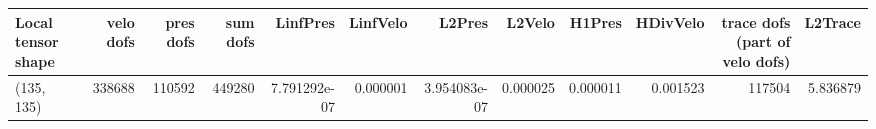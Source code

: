 \begin{tabular}{lrrrrrrrrrrr}
\toprule
Local tensor shape &  velo dofs &  pres dofs &  sum dofs &     LinfPres &  LinfVelo &       L2Pres &   L2Velo &   H1Pres &  HDivVelo &  trace dofs (part of velo dofs) &  L2Trace \\
\midrule
        (135, 135) &     338688 &     110592 &    449280 & 7.791292e-07 &  0.000001 & 3.954083e-07 & 0.000025 & 0.000011 &  0.001523 &                          117504 & 5.836879 \\
\bottomrule
\end{tabular}

